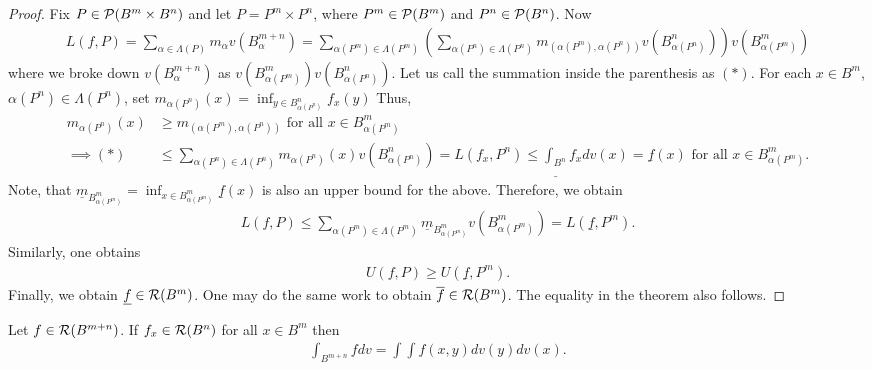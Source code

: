 \begin{proof}
    Fix $P \in \mathcal{P}(B^{m} \times B^{n})$ and let $P = P^{m} \times P^{n}$, where $P^{m} \in \mathcal{P}(B^{m})$ and $P^{n} \in \mathcal{P}(B^{n})$. Now
    \begin{align}
        L(f,P) = \sum_{\alpha \in \Lambda(P)} m_{\alpha} v(B_{\alpha}^{m+n}) = \sum_{\alpha(P^{m}) \in \Lambda(P^{m})} \left( \sum_{\alpha(P^{n}) \in \Lambda(P^{n})} m_{(\alpha(P^{m}),\alpha(P^{n}))} v(B_{\alpha(P^{n})}^{n}) \right) v(B_{\alpha(P^{m})}^{m})
    \end{align}
    where we broke down $v(B_{\alpha}^{m+n})$ as $v(B_{\alpha(P^{m})}^{m}) v(B_{\alpha(P^{n})}^{n})$. Let us call the summation inside the parenthesis as $(\ast)$. For each $x \in B^{m}$, $\alpha(P^{n}) \in \Lambda(P^{n})$, set $m_{\alpha(P^{n})}(x) = \inf_{y \in B_{\alpha(P^{n})}^{n}} f_{x}(y)$ Thus,
    \begin{align}
        m_{\alpha(P^{n})}(x) &\geq m_{(\alpha(P^{m}),\alpha(P^{n}))} \text{ for all } x \in B_{\alpha(P^{m})}^{m} \\ \implies (\ast) &\leq \sum_{\alpha(P^{n}) \in \Lambda(P^{n})} m_{\alpha(P^{n})}(x) v(B_{\alpha(P^{n})}^{n}) = L(f_{x},P^{n}) \leq \underline{\int_{B^{n}}}f_{x}dv(x) = \underline{f}(x) \text{ for all } x \in B_{\alpha(P^{m})}^{m}.
    \end{align}
    Note, that $\underline{m}_{B_{\alpha(P^{m})}^{m}} = \inf_{x \in B_{\alpha(P^{m})}^{m}} \underline{f}(x)$ is also an upper bound for the above. Therefore, we obtain
    \begin{align}
        L(f,P) \leq \sum_{\alpha(P^{m}) \in \Lambda(P^{m})} \underline{m}_{B_{\alpha(P^{m})}^{m}} v(B_{\alpha(P^{m})}^{m}) = L(\underline{f},P^{m}).
    \end{align}
    Similarly, one obtains
    \begin{align}
        U(f,P) \geq U(\underline{f},P^{m}).
    \end{align}
    Finally, we obtain $\underline{f} \in \mathcal{R}(B^{m})$. One may do the same work to obtain $\overline{f} \in \mathcal{R}(B^{m})$. The equality in the theorem also follows.
\end{proof}

\begin{corollary}
    Let $f \in \mathcal{R}(B^{m+n})$. If $f_{x} \in \mathcal{R}(B^{n})$ for all $x \in B^{m}$ then 
    \begin{align}
        \int_{B^{m+n}} f dv = \int \int f(x,y) dv(y) dv(x).
    \end{align}
\end{corollary}

